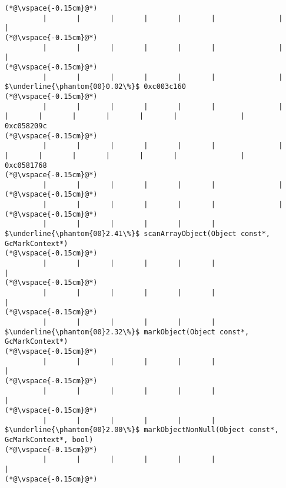 \begin{lstlisting}[caption=NewDirectByteBuffer, label=profile:C2JNewDirectBuffer-512, numberbychapter=true, frame=lines, float, floatplacement=t]
(*@\vspace{-0.15cm}@*)
         |       |       |       |       |       |               |       |
(*@\vspace{-0.15cm}@*)
         |       |       |       |       |       |               |       |
(*@\vspace{-0.15cm}@*)
         |       |       |       |       |       |               |        $\underline{\phantom{00}0.02\%}$ 0xc003c160
(*@\vspace{-0.15cm}@*)
         |       |       |       |       |       |               |                |       |       |       |       |       |               |               0xc058209c
(*@\vspace{-0.15cm}@*)
         |       |       |       |       |       |               |                |       |       |       |       |       |               |               0xc0581768
(*@\vspace{-0.15cm}@*)
         |       |       |       |       |       |               |
(*@\vspace{-0.15cm}@*)
         |       |       |       |       |       |               |
(*@\vspace{-0.15cm}@*)
         |       |       |       |       |       |                $\underline{\phantom{00}2.41\%}$ scanArrayObject(Object const*, GcMarkContext*)
(*@\vspace{-0.15cm}@*)
         |       |       |       |       |       |                       |
(*@\vspace{-0.15cm}@*)
         |       |       |       |       |       |                       |
(*@\vspace{-0.15cm}@*)
         |       |       |       |       |       |                        $\underline{\phantom{00}2.32\%}$ markObject(Object const*, GcMarkContext*)
(*@\vspace{-0.15cm}@*)
         |       |       |       |       |       |                               |
(*@\vspace{-0.15cm}@*)
         |       |       |       |       |       |                               |
(*@\vspace{-0.15cm}@*)
         |       |       |       |       |       |                                $\underline{\phantom{00}2.00\%}$ markObjectNonNull(Object const*, GcMarkContext*, bool)
(*@\vspace{-0.15cm}@*)
         |       |       |       |       |       |                                       |
(*@\vspace{-0.15cm}@*)

\end{lstlisting}

